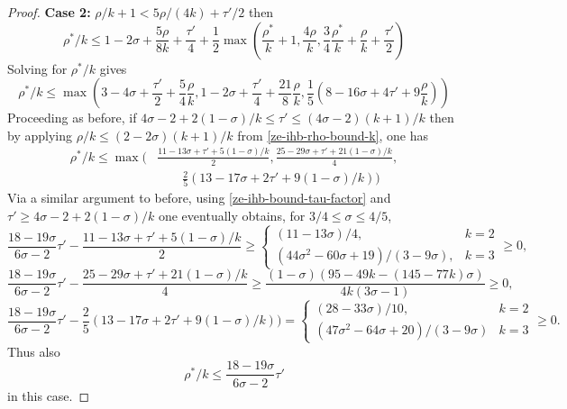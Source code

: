\begin{proof}
\textbf{Case 2:} $\rho/k + 1 < 5\rho/(4k) + \tau'/2$ then
\[
\rho^*/k \leq 1-2\sigma + \frac{5\rho}{8k} + \frac{\tau'}{4} + \frac{1}{2}\max(\frac{\rho^*}{k}+1, \frac{4\rho}{k}, \frac{3}{4}\frac{\rho^*}{k} + \frac{\rho}{k}+\frac{\tau'}{2})
\]
Solving for $\rho^*/k$ gives
\[
\rho^*/k \le \max(3 - 4\sigma + \frac{\tau'}{2} + \frac{5}{4}\frac{\rho}{k}, 1 - 2\sigma + \frac{\tau'}{4} + \frac{21}{8}\frac{\rho}{k}, \frac{1}{5}(8 - 16\sigma + 4\tau' + 9\frac{\rho}{k}))
\]
Proceeding as before, if $4\sigma - 2 + 2(1 - \sigma)/k \le \tau' \le (4\sigma - 2)(k + 1)/k$ then by applying $\rho/k \le (2 - 2\sigma)(k + 1)/k$ from \eqref{ze-ihb-rho-bound-k}, one has
\begin{align*}
\rho^*/k \le \max(&\frac{11 - 13\sigma + \tau' + 5(1 - \sigma)/k}{2}, \frac{25 - 29\sigma + \tau' + 21(1-\sigma)/k}{4},\\
&\qquad\frac{2}{5}(13 - 17 \sigma + 2\tau' + 9 (1 - \sigma)/k))
\end{align*}
Via a similar argument to before, using \eqref{ze-ihb-bound-tau-factor} and $\tau' \ge 4\sigma - 2 + 2(1 - \sigma)/k$ one eventually obtains, for $3/4 \le \sigma \le 4/5$,
\[
\frac{18 - 19\sigma}{6\sigma - 2}\tau' - \frac{11 - 13\sigma + \tau' + 5(1 - \sigma)/k}{2} \ge \begin{cases}
(11 - 13\sigma)/4,&k = 2\\
(44\sigma^2 - 60\sigma + 19)/(3 - 9\sigma),&k=3
\end{cases}\ge 0,
\]
\[
\frac{18 - 19\sigma}{6\sigma - 2}\tau' - \frac{25 - 29\sigma + \tau' + 21(1-\sigma)/k}{4} \ge \frac{(1 - \sigma) (95 - 49 k - (145 - 77 k)\sigma)}{4 k (3\sigma - 1)} \ge 0,
\]
\[
\frac{18 - 19\sigma}{6\sigma - 2}\tau' - \frac{2}{5}(13 - 17 \sigma + 2\tau' + 9(1 - \sigma)/k)) = \begin{cases}
(28 - 33\sigma)/10,&k = 2\\
(47\sigma^2 - 64\sigma + 20)/(3 - 9\sigma)&k=3
\end{cases}\ge 0.
\]
Thus also
\[
\rho^*/k \le \frac{18 - 19\sigma}{6\sigma - 2}\tau'
\]
in this case.


\end{proof}
